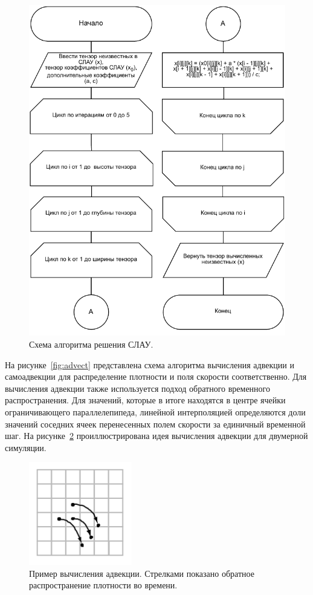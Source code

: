 \begin{figure}[H]
	\centering
	\includegraphics[width=1.0\textwidth,page=1]{assets/img/gauss-zeidel.pdf}
	\caption{Схема алгоритма решения СЛАУ.}
	\label{fig:lin_solve}
\end{figure}

На рисунке~\ref{fig:advect} представлена схема алгоритма вычисления адвекции и самоадвекции для распределение плотности и поля скорости соответственно. Для вычисления адвекции также используется подход обратного временного распространения. Для значений, которые в итоге находятся в центре ячейки ограничивающего параллелепипеда, линейной интерполяцией определяются доли значений соседних ячеек перенесенных полем скорости за единичный временной шаг. На рисунке~\ref{fig:advect_idea} проиллюстрирована идея вычисления адвекции для двумерной симуляции.

\begin{figure}[H]
	\centering
	\includegraphics[width=0.4\textwidth,page=1]{assets/img/advect.png}
	\caption{Пример вычисления адвекции. Стрелками показано обратное распространение плотности во времени.}
	\label{fig:advect_idea}
\end{figure}

